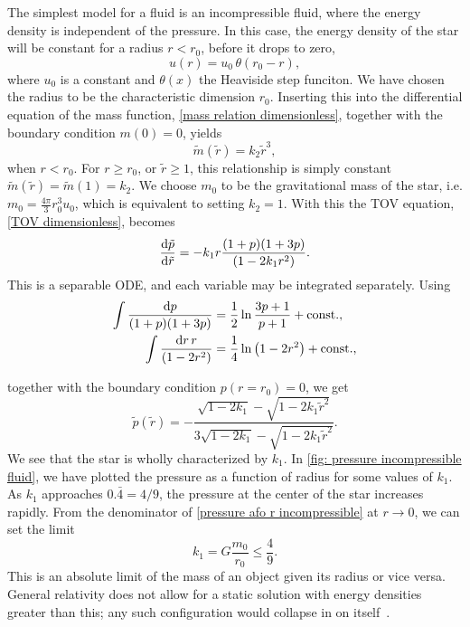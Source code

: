 The simplest model for a fluid is an incompressible fluid, where the energy density is independent of the pressure.
In this case, the energy density of the star will be constant for a radius $r < r_0$, before it drops to zero,
%
\begin{equation}
    u(r) = u_0 \, \theta (r_0 - r),
\end{equation}
%
where $u_0$ is a constant and $\theta(x)$ the Heaviside step funciton.
We have chosen the radius to be the characteristic dimension $r_0$.
Inserting this into the differential equation of the mass function, \autoref{mass relation dimensionless}, together with the boundary condition $m(0) = 0$, yields
%
\begin{equation}
    \tilde m(\tilde r) = k_2 \tilde r^3,
\end{equation}
%
when $r < r_0$.
For $r \geq r_0$, or $\tilde r \geq 1$, this relationship is simply constant $\tilde m(\tilde r) = \tilde m(1) = k_2$.
We choose $m_0$ to be the gravitational mass of the star, i.e. $m_0 = \frac{4 \pi }{3} r_0^3 u_0$, which is equivalent to setting $k_2 = 1$.
With this the TOV equation, \autoref{TOV dimensionless}, becomes
%
\begin{equation} 
    \diff{\tilde p}{\tilde r} = - k_1 r \frac{(1 + p)(1 + 3 p)}{(1 - 2 k_1 r^2)}.
\end{equation}
%
This is a separable ODE, and each variable may be integrated separately.
Using
%
\begin{align}
    \int \frac{\text{d} p}{(1 + p)(1 + 3p)} 
    & = \frac{1}{2} \ln \frac{3p + 1}{p + 1} + \mathrm{const.} , \\
    \int \frac{\text{d} r \, r}{(1 - 2 r^2)} 
    & = \frac{1}{4}\ln\left(1 - 2 r^2 \right)
    + \mathrm{const.},
\end{align}
%

together with the boundary condition $p(r = r_0) = 0$, we get 
%
\begin{equation}
    \label{pressure afo r incompressible}
    \tilde p(\tilde r) 
    = 
    - \frac{\sqrt{1 - 2 k_1} - \sqrt{1 - 2 k_1 \tilde r^2}}{3 \sqrt{1 - 2 k_1 } - \sqrt{1 - 2 k_1 \tilde r^2}}.
\end{equation}
%
We see that the star is wholly characterized by $k_1$.
In \autoref{fig: pressure incompressible fluid}, we have plotted the pressure as a function of radius for some values of $k_1$.
As $k_1$ approaches $0.\bar 4 = 4/9$, the pressure at the center of the star increases rapidly.
From the denominator of \autoref{pressure afo r incompressible} at $r\rightarrow 0$, we can set the limit
%
\begin{equation}
    k_1 = G \frac{m_0}{r_0} \leq \frac{4}{9}.
\end{equation}
%
This is an absolute limit of the mass of an object given its radius or vice versa.
General relativity does not allow for a static solution with energy densities greater than this; any such configuration would collapse in on itself~\autocite{carrollSpacetimeGeometryIntroduction2019}.

